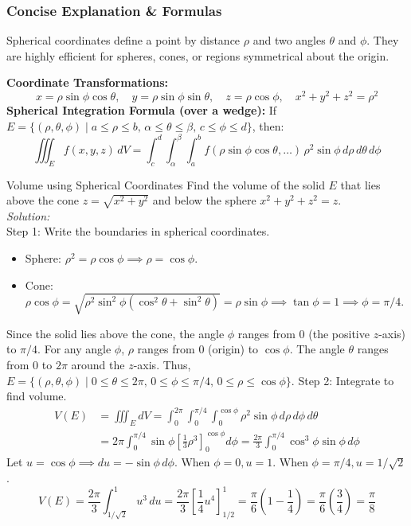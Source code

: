 \documentclass[11pt]{article}
\begin{document}
\subsubsection*{Concise Explanation \& Formulas}
Spherical coordinates define a point by distance $\rho$ and two angles $\theta$ and $\phi$. They are highly efficient for spheres, cones, or regions symmetrical about the origin.
\begin{formulabox}
    \textbf{Coordinate Transformations:}
    \[ x = \rho\sin\phi\cos\theta, \quad y = \rho\sin\phi\sin\theta, \quad z = \rho\cos\phi, \quad x^2 + y^2 + z^2 = \rho^2 \]
    \textbf{Spherical Integration Formula (over a wedge):}
    If $E = \{(\rho, \theta, \phi) \mid a \le \rho \le b, \, \alpha \le \theta \le \beta, \, c \le \phi \le d\}$, then:
    \[ \iiint_E f(x,y,z)\,dV = \int_c^d \int_\alpha^\beta \int_a^b f(\rho\sin\phi\cos\theta, \dots) \, \rho^2\sin\phi\,d\rho\,d\theta\,d\phi \]
\end{formulabox}

\begin{examplebox}{Volume using Spherical Coordinates}
    Find the volume of the solid $E$ that lies above the cone $z = \sqrt{x^2+y^2}$ and below the sphere $x^2+y^2+z^2 = z$.\\
    \textit{Solution:}\\
    Step 1: Write the boundaries in spherical coordinates.
    \begin{itemize}
        \item Sphere: $\rho^2 = \rho\cos\phi \implies \rho = \cos\phi$.
        \item Cone: $\rho\cos\phi = \sqrt{\rho^2\sin^2\phi(\cos^2\theta+\sin^2\theta)} = \rho\sin\phi \implies \tan\phi = 1 \implies \phi = \pi/4$.
    \end{itemize}
    Since the solid lies above the cone, the angle $\phi$ ranges from $0$ (the positive $z$-axis) to $\pi/4$.
    For any angle $\phi$, $\rho$ ranges from $0$ (origin) to $\cos\phi$.
    The angle $\theta$ ranges from $0$ to $2\pi$ around the $z$-axis.
    Thus, $E = \{(\rho,\theta,\phi) \mid 0 \le \theta \le 2\pi, \, 0 \le \phi \le \pi/4, \, 0 \le \rho \le \cos\phi\}$.
    Step 2: Integrate to find volume.
    \begin{align*}
        V(E) &= \iiint_E dV = \int_0^{2\pi} \int_0^{\pi/4} \int_0^{\cos\phi} \rho^2\sin\phi\,d\rho\,d\phi\,d\theta \\
        &= 2\pi \int_0^{\pi/4} \sin\phi \left[ \frac{1}{3}\rho^3 \right]_0^{\cos\phi} d\phi = \frac{2\pi}{3} \int_0^{\pi/4} \cos^3\phi\sin\phi\,d\phi
    \end{align*}
    Let $u = \cos\phi \implies du = -\sin\phi\,d\phi$.
    When $\phi = 0, u = 1$. When $\phi = \pi/4, u = 1/\sqrt{2}$.
    \[ V(E) = \frac{2\pi}{3} \int_{1/\sqrt{2}}^1 u^3\,du = \frac{2\pi}{3} \left[ \frac{1}{4}u^4 \right]_{1/2}^1 = \frac{\pi}{6} \left( 1 - \frac{1}{4} \right) = \frac{\pi}{6}\left(\frac{3}{4}\right) = \frac{\pi}{8} \]
\end{examplebox}
\end{document}
